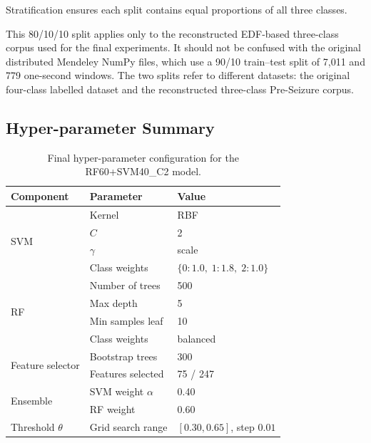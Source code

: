 \documentclass[12pt, a4paper]{report}
\begin{document}
Stratification ensures each split contains equal proportions of all three
classes.

This 80/10/10 split applies only to the reconstructed EDF-based
three-class corpus used for the final experiments. It should not be
confused with the original distributed Mendeley NumPy files, which use a
90/10 train--test split of 7{,}011 and 779 one-second windows. The two
splits refer to different datasets: the original four-class labelled
dataset and the reconstructed three-class Pre-Seizure corpus.

\subsection{Hyper-parameter Summary}

\begin{table}[H]
  \centering
  \caption{Final hyper-parameter configuration for the RF60+SVM40\_C2 model.}
  \label{tab:hyperparams}
  \begin{tabular}{lll}
    \toprule
    \textbf{Component} & \textbf{Parameter} & \textbf{Value} \\
    \midrule
    \multirow{4}{*}{SVM}
      & Kernel              & RBF \\
      & $C$                 & 2 \\
      & $\gamma$            & scale \\
      & Class weights       & $\{0:1.0,\;1:1.8,\;2:1.0\}$ \\
    \midrule
    \multirow{4}{*}{RF}
      & Number of trees     & 500 \\
      & Max depth           & 5 \\
      & Min samples leaf    & 10 \\
      & Class weights       & balanced \\
    \midrule
    \multirow{2}{*}{Feature selector}
      & Bootstrap trees     & 300 \\
      & Features selected   & 75 / 247 \\
    \midrule
    \multirow{2}{*}{Ensemble}
      & SVM weight $\alpha$ & 0.40 \\
      & RF weight           & 0.60 \\
    \midrule
    Threshold $\theta$     & Grid search range  & $[0.30, 0.65]$, step $0.01$ \\
    \bottomrule
  \end{tabular}
\end{table}
\end{document}

